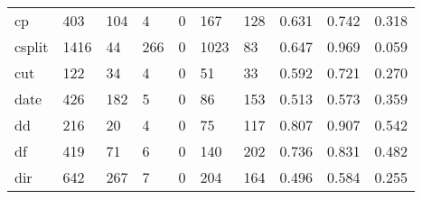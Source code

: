 \begin{longtable}{lp{1.3cm}p{1.3cm}p{1.3cm}p{1.3cm}p{1.3cm}p{1.3cm}p{1.3cm}p{1.3cm}p{1.3cm}}
cp        &                    403 &                                104 &                                 4 &                                0 &                               167 &                             128 &                                0.631 &                                  0.742 &                                0.318 \\
csplit    &                   1416 &                                 44 &                               266 &                                0 &                              1023 &                              83 &                                0.647 &                                  0.969 &                                0.059 \\
cut       &                    122 &                                 34 &                                 4 &                                0 &                                51 &                              33 &                                0.592 &                                  0.721 &                                0.270 \\
date      &                    426 &                                182 &                                 5 &                                0 &                                86 &                             153 &                                0.513 &                                  0.573 &                                0.359 \\
dd        &                    216 &                                 20 &                                 4 &                                0 &                                75 &                             117 &                                0.807 &                                  0.907 &                                0.542 \\
df        &                    419 &                                 71 &                                 6 &                                0 &                               140 &                             202 &                                0.736 &                                  0.831 &                                0.482 \\
dir       &                    642 &                                267 &                                 7 &                                0 &                               204 &                             164 &                                0.496 &                                  0.584 &                                0.255 \\

\end{longtable}
